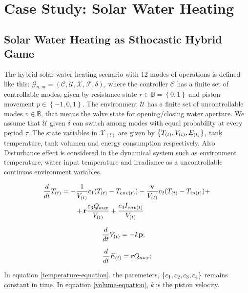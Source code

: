 \documentclass[conference]{IEEEtran}
\begin{document}
\section{Case Study: Solar Water Heating}


\subsection{Solar Water Heating as Sthocastic Hybrid Game}

The hybrid solar water heating scenario with 12 modes of operations is
defined  like this: $\mathcal{G}_{n,m} = (\mathcal{C,U,X,F},\delta)$, 
where the controller $\mathcal{C}$ has a finite set of controllable modes,
given by resistance state ${r \in \mathbb{B} = \left\lbrace 0,1 \right\rbrace }$ 
and piston movement $p \in \left\lbrace-1,0,1\right\rbrace $. 
The environment $\mathcal{U}$ has a finite set of uncontrollable modes
 $v \in \mathbb{B} $, that means the valve state for opening/closing
water aperture. We assume that $\mathcal{U}$ given $\delta$ can switch
among modes with equal probability at every period $\tau$. The state variables
in $\mathcal{X}_{(t)}$ are given by $\left\lbrace T_{(t)},V_{(t)},E_{(t)} \right\rbrace $, 
tank temperature, tank volumen and energy consumption respectively. Also 
Disturbance effect is considered in the dynamical system such as environment
temperature, water input temperature and irradiance as a uncontrollable 
continuos environment variables.


\begin{align}
    \frac{d}{dt}\tcont &=   -\frac{1}{\vcont}  \constone(\tcont-\tenv) - 
    \frac{ \textbf{v} }{\vcont}\consttwo (\tcont-\tin) + \notag\\ &\qquad +
    \textbf{r} \frac{ \constthree \auxheat  }{\vcont}  + 
    \frac{ \constfour \irradiance}{\vcont} 
\label{temperature-equation}
\end{align}

\begin{equation}
    \frac{d}{dt}\vcont = -k \textbf{p}; \quad
\label{volume-equation}
\end{equation}

\begin{equation} 
\frac{d}{dt}\energy =  \textbf{r}  \auxheat ;
\label{Energy-equation}
\end{equation}

In equation \ref{temperature-equation}. the paremeters,  $\left\lbrace 
c_1, c_{2}, c_{3}, c_{4} \right\rbrace $ 
remains constant in time. In equation \ref{volume-equation}, 
\emph{k} is the piston velocity.
\end{document}
